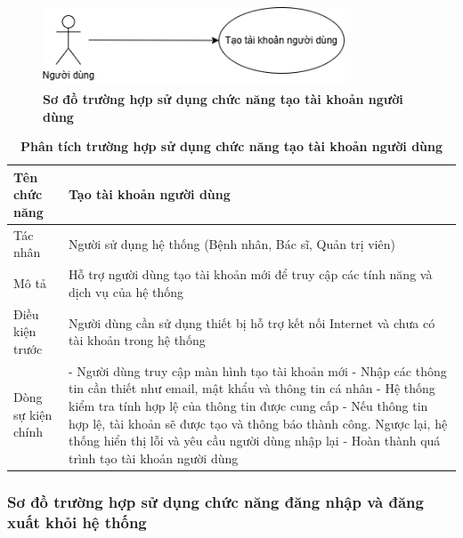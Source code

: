 \begin{figure}[H]
	\centering
	\includegraphics[width=9cm,height=2.5cm]{Images/use_case/use_case_register.png}
	\caption[Sơ đồ trường hợp sử dụng chức năng tạo tài khoản người dùng]{\bfseries \fontsize{12pt}{0pt}
		\selectfont Sơ đồ trường hợp sử dụng chức năng tạo tài khoản người dùng}
	\label{use_case_register} %
\end{figure}

\begin{table}[H]
	\caption{\bfseries \fontsize{12pt}{0pt}\selectfont Phân tích trường hợp sử dụng chức năng tạo tài khoản người dùng}
	\centering
	\begin{tabularx}{\textwidth}{|X|X|}
		\hline
		\textbf{Tên chức năng} & \textbf{Tạo tài khoản người dùng}                                                           \\
		\hline
		Tác nhân               & Người sử dụng hệ thống (Bệnh nhân, Bác sĩ, Quản trị viên)                                   \\
		\hline
		Mô tả                  & Hỗ trợ người dùng tạo tài khoản mới để truy cập các tính năng và dịch vụ của hệ thống       \\
		\hline
		Điều kiện trước        & Người dùng cần sử dụng thiết bị hỗ trợ kết nối Internet và chưa có tài khoản trong hệ thống \\
		\hline
		Dòng sự kiện chính     &
		- Người dùng truy cập màn hình tạo tài khoản mới \newline
		- Nhập các thông tin cần thiết như email, mật khẩu và thông tin cá nhân \newline
		- Hệ thống kiểm tra tính hợp lệ của thông tin được cung cấp \newline
		- Nếu thông tin hợp lệ, tài khoản sẽ được tạo và thông báo thành công. Ngược lại, hệ thống hiển thị lỗi và yêu cầu người dùng nhập lại \newline
		- Hoàn thành quá trình tạo tài khoản người dùng                                                                      \\
		\hline
	\end{tabularx}
\end{table}

\subsubsection{Sơ đồ trường hợp sử dụng chức năng đăng nhập và đăng xuất khỏi hệ thống}

